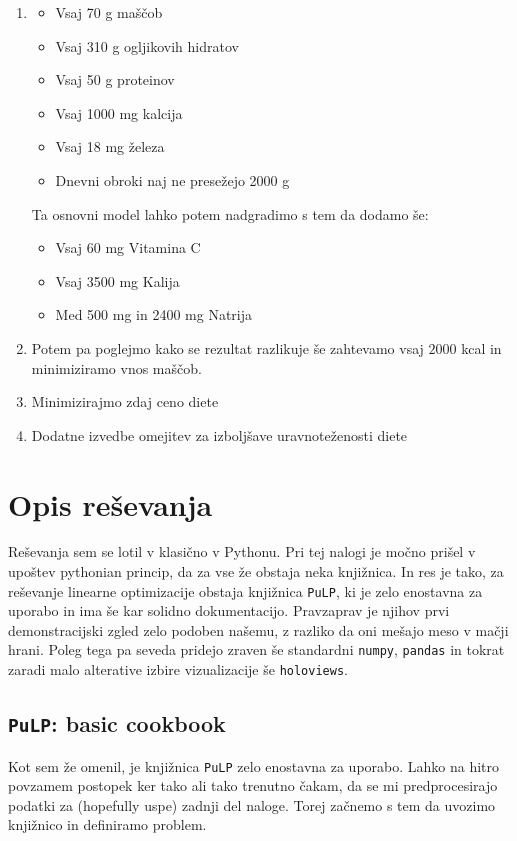 \documentclass[a4paper]{article}
\begin{document}
\begin{enumerate}
    \item \begin{itemize}
        \item Vsaj 70 g maščob
        \item Vsaj 310 g ogljikovih hidratov
        \item Vsaj 50 g proteinov
        \item Vsaj 1000 mg kalcija
        \item Vsaj 18 mg železa
        \item Dnevni obroki naj ne presežejo 2000 g
    \end{itemize}

    Ta osnovni model lahko potem nadgradimo s tem da dodamo še:
    \begin{itemize}
        \item Vsaj 60 mg Vitamina C
        \item Vsaj 3500 mg Kalija
        \item Med 500 mg in 2400 mg Natrija
    \end{itemize}

    \item Potem pa poglejmo kako se rezultat razlikuje še zahtevamo vsaj $2000$ kcal in minimiziramo
    vnos maščob.

    \item Minimizirajmo zdaj ceno diete
    \item Dodatne izvedbe omejitev za izboljšave uravnoteženosti diete

\end{enumerate}

\section{Opis reševanja}
Reševanja sem se lotil v klasično v Pythonu. Pri tej nalogi je močno prišel v upoštev 
pythonian princip, da za vse že obstaja neka knjižnica. In res je tako, za reševanje linearne 
optimizacije obstaja knjižnica \texttt{PuLP}, ki je zelo enostavna za uporabo in ima še kar solidno 
dokumentacijo. Pravzaprav je njihov prvi demonstracijski zgled zelo podoben našemu, z razliko da oni
mešajo meso v mačji hrani. Poleg tega pa seveda pridejo zraven še standardni \texttt{numpy}, \texttt{pandas}
in tokrat zaradi malo alterative izbire vizualizacije še \texttt{holoviews}. \\


\subsection{\texttt{PuLP}: basic cookbook}
Kot sem že omenil, je knjižnica \texttt{PuLP} zelo enostavna za uporabo. Lahko na hitro povzamem postopek
ker tako ali tako trenutno čakam, da se mi predprocesirajo podatki za (hopefully uspe) zadnji del naloge.
Torej začnemo s tem da uvozimo knjižnico in definiramo problem. 
\end{document}
